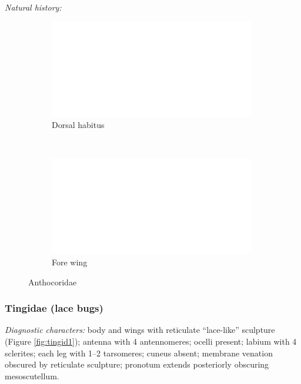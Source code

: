 \documentclass[letterpaper, 11pt]{article}
\begin{document}
\noindent{}\textit{Natural history:} \\

\begin{figure}[ht!]
 \centering
 \begin{subfigure}[ht!]{0.45\textwidth}
  \includegraphics[width=\textwidth]{image14}
  \caption{Dorsal habitus}
  \label{fig:anthocorid1}
 \end{subfigure}
 ~ %
 \begin{subfigure}[ht!]{0.45\textwidth}
  \includegraphics[width=\textwidth]{image14}
  \caption{Fore wing}
  \label{fig:anthocoridwing}
 \end{subfigure}
 \caption{Anthocoridae}\label{fig:anthocorid}
\end{figure}

\subsubsection{Tingidae (lace bugs)}
\noindent{}\textit{Diagnostic characters:} body and wings with reticulate ``lace-like'' sculpture (Figure \ref{fig:tingid1}); antenna with 4 antennomeres; ocelli present; labium with 4 sclerites;  each leg with 1--2 tarsomeres; cuneus absent; membrane venation obscured by reticulate sculpture; pronotum extends posteriorly obscuring mesoscutellum.\\
\end{document}
